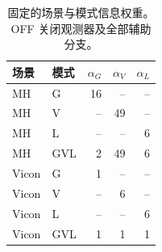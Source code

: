 \begin{table}[tb]
\caption{固定的场景与模式信息权重。OFF 关闭观测器及全部辅助分支。}\label{tab:weights}
\centering\small
\begin{tabular}{llrrr}
\toprule
场景 & 模式 & $\alpha_G$ & $\alpha_V$ & $\alpha_L$ \\
\midrule
MH & G & 16 & -- & -- \\
MH & V & -- & 49 & -- \\
MH & L & -- & -- & 6 \\
MH & GVL & 2 & 49 & 6 \\
Vicon & G & 1 & -- & -- \\
Vicon & V & -- & 6 & -- \\
Vicon & L & -- & -- & 6 \\
Vicon & GVL & 1 & 1 & 1 \\
\bottomrule
\end{tabular}
\end{table}
